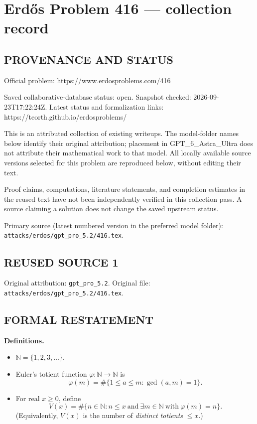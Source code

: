 \section*{Erd\H{o}s Problem 416 --- collection record}

\subsection*{PROVENANCE AND STATUS}
Official problem: https://www.erdosproblems.com/416

Saved collaborative-database status: open.
Snapshot checked: 2026-09-23T17:22:24Z.
Latest status and formalization links: https://teorth.github.io/erdosproblems/

This is an attributed collection of existing writeups. The model-folder names below identify their original attribution; placement in GPT\_6\_Astra\_Ultra does not attribute their mathematical work to that model. All locally available source versions selected for this problem are reproduced below, without editing their text.

Proof claims, computations, literature statements, and completion estimates in the reused text have not been independently verified in this collection pass. A source claiming a solution does not change the saved upstream status.

Primary source (latest numbered version in the preferred model folder): \texttt{attacks/erdos/gpt\_pro\_5.2/416.tex}.

\subsection*{REUSED SOURCE 1}
Original attribution: \texttt{gpt\_pro\_5.2}.
Original file: \texttt{attacks/erdos/gpt\_pro\_5.2/416.tex}.



\subsection*{FORMAL RESTATEMENT}
\textbf{Definitions.}
\begin{itemize}
\item $\mathbb{N}=\{1,2,3,\dots\}$.
\item Euler's totient function $\varphi:\mathbb{N}\to\mathbb{N}$ is
\[
\varphi(m)=\#\{1\le a\le m : \gcd(a,m)=1\}.
\]
\item For real $x\ge 0$, define
\[
V(x)=\#\{n\in\mathbb{N}: n\le x \ \text{and}\ \exists m\in\mathbb{N}\ \text{with}\ \varphi(m)=n\}.
\]
(Equivalently, $V(x)$ is the number of \emph{distinct totients} $\le x$.)
\end{itemize}

